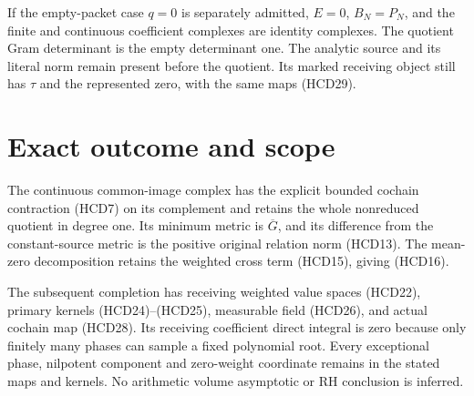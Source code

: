 \documentclass[11pt]{article}
\begin{document}
If the empty-packet case $q=0$ is separately admitted,
$E=0$, $B_N=P_N$, and the finite and continuous coefficient
complexes are identity complexes. The quotient Gram
determinant is the empty determinant one. The analytic
source and its literal norm remain present before the
quotient. Its marked receiving object still has $\tau$
and the represented zero, with the same maps (HCD29).

\section{Exact outcome and scope}

The continuous common-image complex has the explicit bounded
cochain contraction (HCD7) on its complement and retains
the whole nonreduced quotient in degree one.
Its minimum metric is $\overline G$, and its difference
from the constant-source metric is the positive original
relation norm (HCD13). The mean-zero decomposition retains
the weighted cross term (HCD15), giving (HCD16).

The subsequent completion has receiving weighted value
spaces (HCD22), primary kernels (HCD24)--(HCD25), measurable
field (HCD26), and actual cochain map (HCD28).
Its receiving coefficient direct integral is zero because
only finitely many phases can sample a fixed polynomial root.
Every exceptional phase, nilpotent component and zero-weight
coordinate remains in the stated maps and kernels.
No arithmetic volume asymptotic or RH conclusion is inferred.
\end{document}
